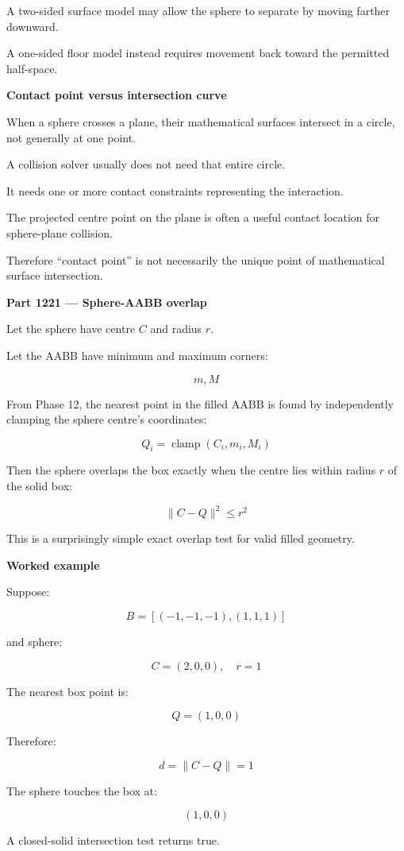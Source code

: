 A two-sided surface model may allow the sphere to separate by moving farther downward.

A one-sided floor model instead requires movement back toward the permitted half-space.

\textbf{Contact point versus intersection curve}

When a sphere crosses a plane, their mathematical surfaces intersect in a circle, not generally at one point.

A collision solver usually does not need that entire circle.

It needs one or more contact constraints representing the interaction.

The projected centre point on the plane is often a useful contact location for sphere-plane collision.

Therefore ``contact point'' is not necessarily the unique point of mathematical surface intersection.

\textbf{Part 1221 --- Sphere-AABB overlap}

Let the sphere have centre \(C\) and radius \(r\).

Let the AABB have minimum and maximum corners:

\[
m,M
\]

From Phase 12, the nearest point in the filled AABB is found by independently clamping the sphere centre's coordinates:

\[
\boxed{ Q_i=\operatorname{clamp}(C_i,m_i,M_i) }
\]

Then the sphere overlaps the box exactly when the centre lies within radius \(r\) of the solid box:

\[
\boxed{ \|C-Q\|^2\le r^2 }
\]

This is a surprisingly simple exact overlap test for valid filled geometry.

\textbf{Worked example}

Suppose:

\[
B=[(-1,-1,-1),(1,1,1)]
\]

and sphere:

\[
C=(2,0,0),\quad r=1
\]

The nearest box point is:

\[
Q=(1,0,0)
\]

Therefore:

\[
d=\|C-Q\|=1
\]

The sphere touches the box at:

\[
(1,0,0)
\]

A closed-solid intersection test returns true.

